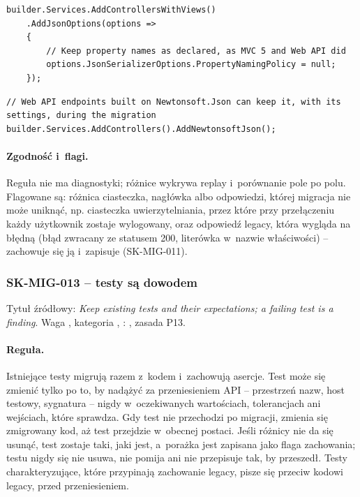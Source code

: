 \begin{lstlisting}
builder.Services.AddControllersWithViews()
    .AddJsonOptions(options =>
    {
        // Keep property names as declared, as MVC 5 and Web API did
        options.JsonSerializerOptions.PropertyNamingPolicy = null;
    });
\end{lstlisting}

\begin{lstlisting}
// Web API endpoints built on Newtonsoft.Json can keep it, with its settings, during the migration
builder.Services.AddControllers().AddNewtonsoftJson();
\end{lstlisting}

\paragraph{Zgodność i~flagi.} Reguła nie ma diagnostyki; różnice wykrywa replay
i~porównanie pole po polu. Flagowane są: różnica ciasteczka, nagłówka albo odpowiedzi,
której migracja nie może uniknąć, np. ciasteczka uwierzytelniania, przez które przy
przełączeniu każdy użytkownik zostaje wylogowany, oraz odpowiedź legacy, która wygląda na
błędną (błąd zwracany ze statusem 200, literówka w~nazwie właściwości) -- zachowuje się ją
i~zapisuje (SK-MIG-011).


\subsubsection{SK-MIG-013 -- testy są dowodem}\label{sec:standardy-sk-mig-013}

Tytuł źródłowy: \emph{Keep existing tests and their expectations; a failing test is a
finding}. Waga , kategoria , :
, zasada P13.

\paragraph{Reguła.} Istniejące testy migrują razem z~kodem i~zachowują asercje. Test może
się zmienić tylko po to, by nadążyć za przeniesieniem API -- przestrzeń nazw, host testowy,
sygnatura  -- nigdy w~oczekiwanych wartościach, tolerancjach ani wejściach,
które sprawdza. Gdy test nie przechodzi po migracji, zmienia się zmigrowany kod, aż test
przejdzie w~obecnej postaci. Jeśli różnicy nie da się usunąć, test zostaje taki, jaki jest,
a~porażka jest zapisana jako flaga zachowania; testu nigdy się nie usuwa, nie pomija ani nie
przepisuje tak, by przeszedł. Testy charakteryzujące, które przypinają zachowanie legacy,
pisze się przeciw kodowi legacy, przed przeniesieniem.

